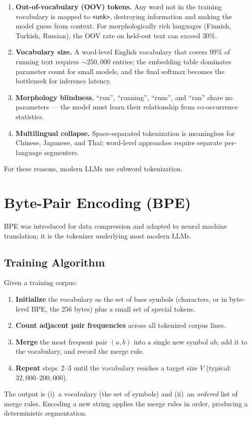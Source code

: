 \begin{enumerate}
  \item \textbf{Out-of-vocabulary (OOV) tokens.} Any word not in the
        training vocabulary is mapped to \texttt{<unk>}, destroying
        information and making the model guess from context. For
        morphologically rich languages (Finnish, Turkish, Russian),
        the OOV rate on held-out text can exceed 30\%.
  \item \textbf{Vocabulary size.} A word-level English vocabulary that
        covers 99\% of running text requires $\sim\!250{,}000$
        entries; the embedding table dominates parameter count for
        small models, and the final softmax becomes the bottleneck
        for inference latency.
  \item \textbf{Morphology blindness.} ``run'', ``running'', ``runs'',
        and ``ran'' share no parameters — the model must learn their
        relationship from co-occurrence statistics.
  \item \textbf{Multilingual collapse.} Space-separated tokenization is
        meaningless for Chinese, Japanese, and Thai; word-level
        approaches require separate per-language segmenters.
\end{enumerate}

For these reasons, modern LLMs use subword tokenization.

\section{Byte-Pair Encoding (BPE)}

BPE was introduced for data compression \citep{sennrich2016bpe} and
adapted to neural machine translation; it is the tokenizer underlying
most modern LLMs.

\subsection{Training Algorithm}

Given a training corpus:
\begin{enumerate}
  \item \textbf{Initialize} the vocabulary as the set of base symbols
        (characters, or in byte-level BPE, the 256 bytes) plus a small
        set of special tokens.
  \item \textbf{Count adjacent pair frequencies} across all tokenized
        corpus lines.
  \item \textbf{Merge} the most frequent pair $(a, b)$ into a single
        new symbol $ab$, add it to the vocabulary, and record the
        merge rule.
  \item \textbf{Repeat} steps~2--3 until the vocabulary reaches a
        target size $V$ (typical: $32{,}000$--$200{,}000$).
\end{enumerate}
The output is (i)~a vocabulary (the set of symbols) and (ii)~an
\emph{ordered} list of merge rules. Encoding a new string applies the
merge rules in order, producing a deterministic segmentation.

